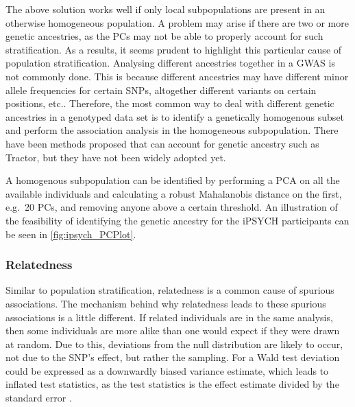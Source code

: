 The above solution works well if only local subpopulations are present in an otherwise homogeneous population. A problem may arise if there are two or more genetic ancestries, as the PCs may not be able to properly account for such stratification. As a results, it seems prudent to highlight this particular cause of population stratification. Analysing different ancestries together in a GWAS is not commonly done. This is because different ancestries may have different minor allele frequencies for certain SNPs, altogether different variants on certain positions, etc.\cite{helgason2005icelandic}. Therefore, the most common way to deal with different genetic ancestries in a genotyped data set is to identify a genetically homogenous subset and perform the association analysis in the homogeneous subpopulation. There have been methods proposed that can account for genetic ancestry such as Tractor\cite{atkinson2021tractor}, but they have not been widely adopted yet. 

A homogenous subpopulation can be identified by performing a PCA on all the available individuals and calculating a robust Mahalanobis distance on the first, e.g.\ 20 PCs, and removing anyone above a certain threshold\cite{prive2020efficient}. An illustration of the feasibility of identifying the genetic ancestry for the iPSYCH participants can be seen in \cref{fig:ipsych_PCPlot}.

\subsubsection{Relatedness}
Similar to population stratification, relatedness is a common cause of spurious associations. The mechanism behind why relatedness leads to these spurious associations is a little different. If related individuals are in the same analysis, then some individuals are more alike than one would expect if they were drawn at random. Due to this, deviations from the null distribution are likely to occur, not due to the SNP's effect, but rather the sampling. For a Wald test deviation could be expressed as a downwardly biased variance estimate, which leads to inflated test statistics, as the test statistics is the effect estimate divided by the standard error \cite{astle2009population,voight2005confounding,sillanpaa2011overview}. 

